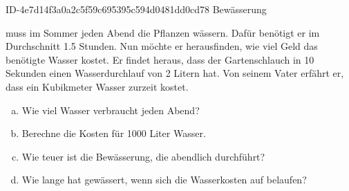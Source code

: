 \begin{exercise}
      {ID-4e7d14f3a0a2c5f59c695395c594d0481dd0cd78}
      {Bewässerung}
  \ifproblem\problem\par
    \xya{} muss im Sommer jeden Abend die Pflanzen wässern. Dafür benötigt er im
    Durchschnitt \num{1.5} Stunden. Nun möchte er herausfinden, wie viel Geld das
    benötigte Wasser kostet. Er findet heraus, dass der Gartenschlauch in
    10 Sekunden einen Wasserdurchlauf von 2 Litern hat. Von seinem Vater erfährt
    er, dass ein Kubikmeter Wasser zurzeit  kostet.
    \begin{enumerate}[a)]
      \item Wie viel Wasser verbraucht \xya{} jeden Abend?
      \item Berechne die Kosten für 1000 Liter Wasser.
      \item Wie teuer ist die Bewässerung, die \xya{} abendlich durchführt?
      \item Wie lange hat \xya{} gewässert, wenn sich die Wasserkosten auf
             belaufen?
    \end{enumerate}
  \fi
\end{exercise}
